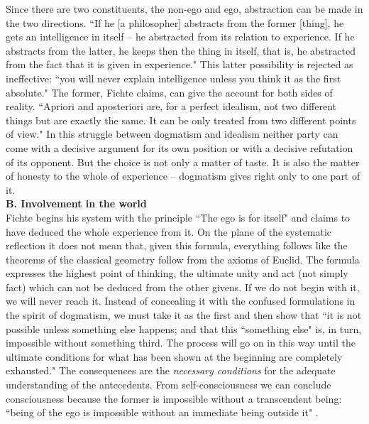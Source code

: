 Since there are two constituents, the non-ego and ego, abstraction can be made in the two directions. ``If he [a philosopher]
abstracts from the former [thing], he gets an intelligence in itself -- he abstracted from its relation to experience. If 
he abstracts from the latter, he keeps then the thing in itself, that is, he abstracted from the fact that it is given in 
experience." \cite{ITS} This latter possibility is rejected as ineffective: ``you will never explain intelligence unless you think 
it as the first absolute." \cite{ITS} The former, Fichte claims, can give the account for both sides of reality. ``Apriori and 
aposteriori are, for a perfect idealism, not two different things but are exactly the same. It can be only treated from 
two different points of view." \cite{ITS} In this struggle between dogmatism and idealism neither party can come with a 
decisive argument for its own position or with a decisive refutation of its opponent. But the choice is not only a 
matter of taste. It is also the matter of honesty to the whole of experience -- dogmatism gives right only to one part 
of it. \\[1ex]
{\bf B. Involvement in the world} \\
Fichte begins his system with the principle ``The ego is for itself" and claims to have deduced the whole 
experience from it. On the plane of the systematic reflection it does not mean that, given this formula, everything 
follows like the theorems of the classical geometry follow from the axioms of Euclid. The formula expresses the 
highest point of thinking, the ultimate unity and act (not simply fact) which can not be deduced from the other 
givens. If we do not begin with it, we will never reach it. Instead of concealing it with the confused formulations 
in the spirit of dogmatism, we must take it as the first and then show that ``it is not possible unless something 
else happens; and that this ``something else" is, in turn, impossible without something third. The process will go 
on in this way until the ultimate conditions for what has been shown at the beginning are completely exhausted." \cite{ITS} 
The consequences are the {\em necessary conditions} for the adequate understanding of the antecedents. From self-consciousness we can conclude consciousness because the former is impossible without a transcendent being: 
``being of the ego is impossible without an immediate being outside it" \cite{ITS}.

